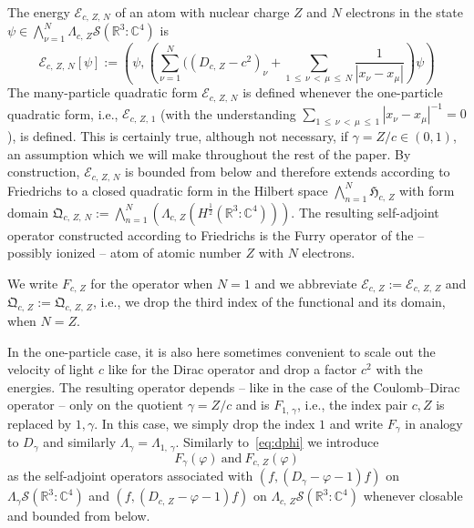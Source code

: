 \documentclass[10pt]{amsart}
\theoremstyle{definition}
\newcommand*\cz{\mathbb{C}}
\newcommand*\rz{\mathbb{R}}
\newcommand*\cE{\mathcal{E}}
\newcommand*\cS{\mathcal{S}}
\newcommand*\gH{\mathfrak{H}}
\newcommand*\gQ{\mathfrak{Q}}
\begin{document}
The energy $\cE_{c,\,Z,\,N}$ of an atom with nuclear charge $Z$ and $N$ electrons in the state $\psi\in \bigwedge_{\nu=1}^N \Lambda_{c,\,Z}\cS(\rz^3:\cz^4)$ is
\begin{equation}\label{eq:manyfurry}
\cE_{c,\,Z,\,N}[\psi]:= \left(\psi,\left(\sum_{\nu=1}^N(\left(D_{c,\,Z}-c^2\right)_\nu+\sum_{1\,\leq\,\nu\,<\,\mu\,\leq\,N}\frac{1}{|x_\nu-x_\mu|}\right)\psi\right)
\end{equation}
The many-particle quadratic form $\cE_{c,\,Z,\,N}$ is defined whenever the one-particle quadratic form, i.e., $\cE_{c,\,Z,\,1}$ (with the understanding $\sum_{1\,\leq\,\nu\,<\,\mu\,\leq\,1}|x_\nu-x_\mu|^{-1}=0$), is defined. This is certainly true, although not necessary, if $\gamma=Z/c\in(0,1)$, an assumption which we will make throughout the rest of the paper. By construction, $\cE_{c,\,Z,\,N}$ is bounded from below and therefore extends according to Friedrichs to a closed quadratic form in the Hilbert space $\bigwedge_{n=1}^N \gH_{c,\,Z}$ with form domain $\gQ_{c,\,Z,\,N}:=\bigwedge_{n=1}^N(\Lambda_{c,\,Z}(H^{\frac12}(\rz^3:\cz^4)))$. The resulting self-adjoint operator constructed according to Friedrichs is the Furry operator of the -- possibly ionized -- atom of atomic number $Z$ with $N$ electrons.

We write $F_{c,\,Z}$ for the operator when $N=1$ and we abbreviate $\cE_{c,\,Z}:=\cE_{c,\,Z,\,Z}$ and $\gQ_{c,\,Z}:= \gQ_{c,\,Z,\,Z}$, i.e., we drop the third index of the functional and its domain, when $N=Z$.

In the one-particle case, it is also here sometimes convenient to scale out the velocity of light $c$ like for the Dirac operator and drop a factor $c^2$ with the energies. The resulting operator depends -- like in the case of the Coulomb--Dirac operator -- only on the quotient $\gamma=Z/c$ and is $F_{1,\,\gamma}$, i.e., the index pair $c,Z$ is replaced by $1,\gamma$. In this case, we simply drop the index $1$ and write $F_\gamma$ in analogy to $D_\gamma$ and similarly $\Lambda_\gamma=\Lambda_{1,\,\gamma}$. Similarly to~\eqref{eq:dphi} we introduce
\begin{equation}\label{eq:fphi}
F_\gamma(\varphi)\ \text{and}\ F_{c,\,Z}(\varphi)
\end{equation}
as the self-adjoint operators associated with $(f,(D_\gamma-\varphi-1)f)$ on $\Lambda_{\gamma}\cS(\rz^3:\cz^4)$ and $(f,(D_{c,\,Z}-\varphi-1)f)$ on $\Lambda_{c,\,Z}\cS(\rz^3:\cz^4)$ whenever closable and bounded from below.
\end{document}
